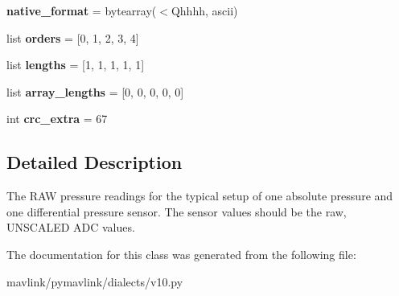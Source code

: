 \begin{DoxyCompactItemize}
\mbox{\label{classpymavlink_1_1dialects_1_1v10_1_1MAVLink__raw__pressure__message_adf9503a99f5206748ffe98a5902e4e4b}} 
{\bfseries native\+\_\+format} = bytearray(\textquotesingle{}$<$Qhhhh\textquotesingle{}, \textquotesingle{}ascii\textquotesingle{})
\item 
\mbox{\label{classpymavlink_1_1dialects_1_1v10_1_1MAVLink__raw__pressure__message_aafeb47694f3e9c616cb00604eb6f4b0d}} 
list {\bfseries orders} = \mbox{[}0, 1, 2, 3, 4\mbox{]}
\item 
\mbox{\label{classpymavlink_1_1dialects_1_1v10_1_1MAVLink__raw__pressure__message_ad66bc64415ace07682ebad90931e2ace}} 
list {\bfseries lengths} = \mbox{[}1, 1, 1, 1, 1\mbox{]}
\item 
\mbox{\label{classpymavlink_1_1dialects_1_1v10_1_1MAVLink__raw__pressure__message_a70e510df8ba1224cfbff03f8f391764b}} 
list {\bfseries array\+\_\+lengths} = \mbox{[}0, 0, 0, 0, 0\mbox{]}
\item 
\mbox{\label{classpymavlink_1_1dialects_1_1v10_1_1MAVLink__raw__pressure__message_ac88b77e55e687747f814c8109d54f8fd}} 
int {\bfseries crc\+\_\+extra} = 67
\end{DoxyCompactItemize}


\subsection{Detailed Description}
\begin{DoxyVerb}The RAW pressure readings for the typical setup of one
absolute pressure and one differential pressure sensor. The
sensor values should be the raw, UNSCALED ADC values.
\end{DoxyVerb}
 

The documentation for this class was generated from the following file\+:\begin{DoxyCompactItemize}
\item 
mavlink/pymavlink/dialects/v10.\+py\end{DoxyCompactItemize}
